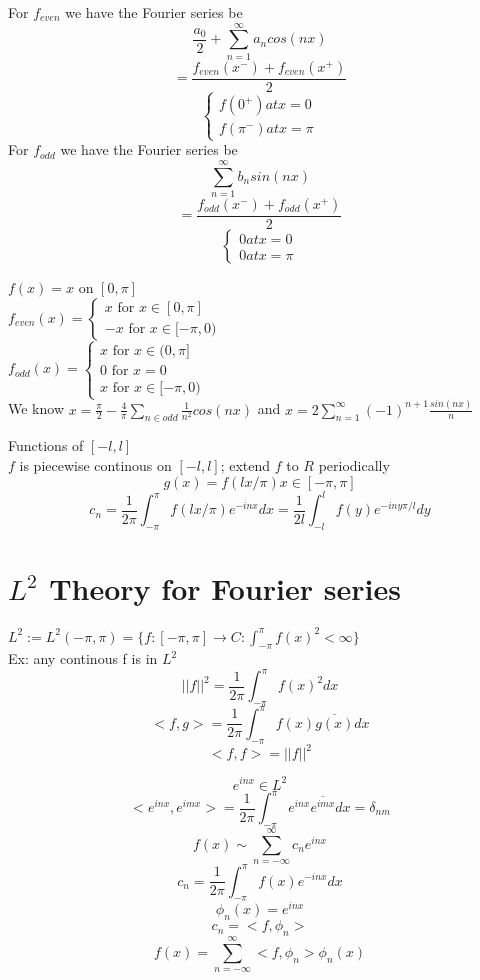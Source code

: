 \documentclass[answers,12pt,addpoints]{exam}
\begin{document}
For $f_{even}$ we have the Fourier series be 
$$ \frac{a_0}{2} + \sum_{n=1}^{\infty} a_n cos(nx)$$
$$ = \frac{f_{even}(x^-) + f_{even}(x^+)}{2}$$
$$ \begin{cases}
    f(0^+) at x = 0\\
    f(\pi^-) at x = \pi
\end{cases}$$
For $f_{odd}$ we have the Fourier series be
$$ \sum_{n=1}^{\infty} b_n sin(nx)$$
$$ = \frac{f_{odd}(x^-) + f_{odd}(x^+)}{2}$$
$$ \begin{cases}
    0 at x = 0\\
    0 at x = \pi
\end{cases}$$
\begin{example}
    $f(x) = x$ on $[0, \pi]$\\
    $f_{even}(x) = \begin{cases}
        x \text{ for } x \in [0, \pi]\\
        -x \text{ for } x \in [-\pi, 0)
    \end{cases}$\\
    $f_{odd}(x) = \begin{cases}
        x \text{ for } x \in (0, \pi]\\
        0 \text{ for } x = 0\\
        x \text{ for } x \in [-\pi, 0)
    \end{cases}$\\
    We know $x = \frac{\pi}{2} - \frac{4}{\pi} \sum_{n \in odd} \frac{1}{n^2}cos(nx)$ and $x = 2\sum_{n=1}^{\infty} (-1)^{n+1} \frac{sin(nx)}{n}$\\
\end{example}

Functions of $[-l, l]$\\
$f$ is piecewise continous on $[-l, l]$; extend $f$ to $R$ periodically\\
$$g(x) = f(lx/\pi) x\in[-\pi,\pi]$$ 
$$c_n = \frac{1}{2\pi} \int_{-\pi}^{\pi} f(lx/\pi) e^{-inx} dx = \frac{1}{2l} \int_{-l}^{l} f(y) e^{-iny\pi/l}dy$$


\section{$L^2$ Theory for Fourier series}
$L^2 := L^2(-\pi, \pi) = \{ f: [-\pi,\pi] \to C: \int_{-\pi}^{\pi} f(x)^2 < \infty\}$\\
Ex: any continous f is in $L^2$\\
$$ ||f||^2 = \frac{1}{2\pi} \int_{-\pi}^{\pi} f(x)^2 dx$$
$$ <f,g> = \frac{1}{2\pi} \int_{-\pi}^{\pi} f(x) \overline{g(x)} dx$$
$$ <f,f> = ||f||^2$$
\begin{example}
    $$e^{inx} \in L^2$$
    $$<e^{inx}, e^{imx}> = \frac{1}{2\pi} \int_{-\pi}^{\pi} e^{inx} \overline{e^{imx}} dx = \delta_{nm}$$
    $$f(x) \sim \sum_{n=-\infty}^{\infty} c_n e^{inx}$$
    $$c_n = \frac{1}{2\pi} \int_{-\pi}^{\pi} f(x) e^{-inx} dx$$
    $$\phi_n(x) = e^{inx}$$
    $$c_n = <f, \phi_n>$$
    $$f(x) = \sum_{n=-\infty}^{\infty} <f, \phi_n> \phi_n(x)$$
\end{example}
\end{document}
